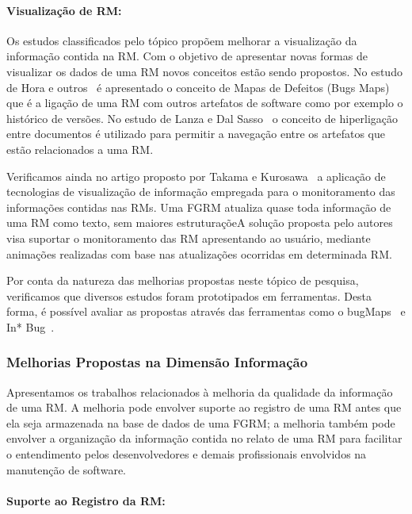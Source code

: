 \paragraph{Visualização de RM:} Os estudos classificados pelo tópico propõem
melhorar a visualização da informação contida na RM\@. Com o objetivo de
apresentar novas formas de visualizar os dados de uma RM novos conceitos estão
sendo propostos. No estudo de Hora e outros~\cite{hora2012bug} é apresentado o
conceito de Mapas de Defeitos (Bugs Maps) que é a ligação de uma RM com outros
artefatos de software como por exemplo o histórico de versões.  No estudo de
Lanza e  Dal Sasso~\cite{dal2014bug} o conceito de hiperligação entre documentos
é utilizado para permitir a navegação entre os artefatos que estão relacionados
a uma RM\@.

Verificamos ainda no artigo proposto por Takama e
Kurosawa~\cite{takama2013application} a aplicação de tecnologias de visualização
de informação empregada para o monitoramento das informações contidas nas RMs.
Uma FGRM atualiza quase toda informação de uma RM como texto, sem maiores
estruturaçõeA solução proposta pelo autores visa suportar o monitoramento das RM
apresentando ao usuário, mediante animações realizadas com base nas atualizações
ocorridas em determinada RM\@.

Por conta da natureza das melhorias propostas neste tópico de pesquisa,
verificamos que diversos estudos foram prototipados em ferramentas. Desta forma,
é possível avaliar as propostas através das ferramentas como o
bugMaps~\cite{hora2012bug} e In* Bug~\cite{dal2014bug}.

\subsubsection{Melhorias Propostas na Dimensão Informação}
\label{ssub:melhorias_dim_informacao}

Apresentamos os trabalhos relacionados à melhoria da qualidade da informação de
uma RM\@. A melhoria pode envolver suporte ao registro de uma RM antes que ela
seja armazenada na base de dados de uma FGRM\@; a melhoria também pode envolver
a organização da informação contida no relato de uma RM para facilitar o
entendimento pelos desenvolvedores e demais profissionais envolvidos na
manutenção de software.

\paragraph{Suporte ao Registro da RM:}

